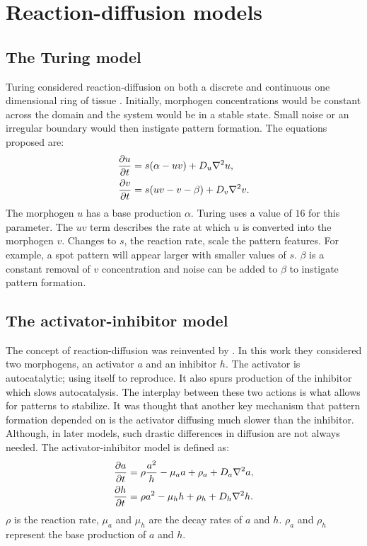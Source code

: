 \section{Reaction-diffusion models}
\subsection{The Turing model}
Turing considered reaction-diffusion on both a discrete and continuous one dimensional ring of tissue \citep{Turing1952}. Initially, morphogen concentrations would be constant across the domain and the system would be in a stable state. Small noise or an irregular boundary would then instigate pattern formation. The equations proposed are:
\begin{equation}
\begin{aligned} \label{eq:turingRD}
		\frac{\partial u}{\partial t} &= s(\alpha-uv) + D_u \nabla^2 u,\\
		\frac{\partial v}{\partial t} &= s(uv-v-\beta) + D_v \nabla^2 v.
\end{aligned}
\end{equation}
The morphogen $u$ has a base production $\alpha$. Turing uses a value of $16$ for this parameter. The $uv$ term describes the rate at which $u$ is converted into the morphogen $v$. Changes to $s$, the reaction rate, scale the pattern features. For example, a spot pattern will appear larger with smaller values of $s$. $\beta$ is a constant removal of $v$ concentration and noise can be added to $\beta$ to instigate pattern formation.

\subsection{The activator-inhibitor model}
The concept of reaction-diffusion was reinvented by \citet{gierer1972}. In this work they considered two morphogens, an activator $a$ and an inhibitor $h$. The activator is autocatalytic; using itself to reproduce. It also spurs production of the inhibitor which slows autocatalysis. The interplay between these two actions is what allows for patterns to stabilize. It was thought that another key mechanism that pattern formation depended on is the activator diffusing much slower than the inhibitor. Although, in later models, such drastic differences in diffusion are not always needed. The activator-inhibitor model is defined as:
\begin{equation}
\begin{aligned} \label{eq:activatorInhibitorRD}
		\frac{\partial a}{\partial t} &= \rho \frac{a^2}{h} - \mu_a a + \rho_a + D_a \nabla^2 a,\\
		\frac{\partial h}{\partial t} &= \rho a^2 - \mu_h h  + \rho_h + D_h \nabla^2 h.
\end{aligned}
\end{equation}
$\rho$ is the reaction rate, $\mu_a$ and $\mu_h$ are the decay rates of $a$ and $h$. $\rho_a$ and $\rho_h$ represent the base production of $a$ and $h$. 


